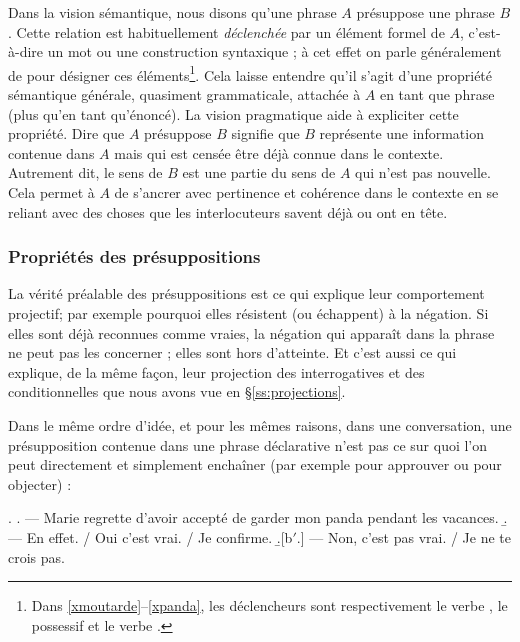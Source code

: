 \begin{refsegment}
Dans la vision sémantique, nous disons qu'une phrase $A$ présuppose une phrase $B$.  
Cette relation est habituellement \emph{déclenchée} par un élément formel de $A$, c'est-à-dire un mot ou une construction syntaxique ; à cet effet on parle généralement de  pour désigner ces éléments\footnote{Dans \ref{xmoutarde}--\ref{xpanda}, les déclencheurs sont respectivement le verbe , le possessif  et le verbe .}.
Cela laisse entendre qu'il s'agit d'une propriété sémantique générale, quasiment grammaticale, attachée à $A$ en tant que phrase (plus qu'en tant qu'énoncé). La vision pragmatique aide à expliciter cette propriété. Dire que $A$ présuppose $B$ signifie que $B$ représente une information contenue dans $A$ mais qui est censée être déjà connue dans le contexte. Autrement dit, le sens de $B$ est une partie du sens de $A$ qui n'est pas nouvelle. Cela permet à $A$ de s'ancrer avec pertinence et cohérence dans le contexte en se reliant avec des choses que les interlocuteurs savent déjà ou ont en tête.

\subsubsection{Propriétés des présuppositions}
\label{sss:ptépsp}

La vérité préalable des présuppositions est  ce qui explique leur comportement projectif; par exemple pourquoi elles résistent (ou échappent) à la négation.  Si elles sont déjà reconnues comme vraies, la négation qui apparaît dans la phrase ne peut pas les concerner ; elles sont hors d'atteinte.
Et c'est aussi ce qui explique, de la même façon,  leur projection des interrogatives et des conditionnelles que nous avons vue en \S\ref{ss:projections}. 





Dans le même ordre d'idée, et pour les mêmes raisons, dans une conversation, une présupposition contenue dans une phrase déclarative n'est pas ce sur quoi l'on peut directement et simplement enchaîner (par exemple pour approuver ou pour objecter) :

\ex. \label{x:pspE}
\a. --- Marie regrette d'avoir accepté de garder mon panda pendant les
vacances.
\b. --- En effet. / Oui c'est vrai. / Je confirme.
\b.[b$'$.] --- Non, c'est pas vrai. / Je ne te crois pas.


\end{refsegment}
